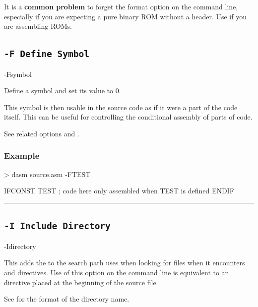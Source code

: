 It is a \textbf{common problem} to forget the format option on the command line, especially if you are expecting a pure binary ROM without a header. Use  if you are assembling ROMs.

\subsection{\texttt{-F Define Symbol}}
\label{flag:definesymbolF}

\begin{usage}
-Fsymbol
\end{usage}

Define a symbol and set its value to 0.

This symbol is then usable in the source code as if it were a part of the code itself. This can be useful for controlling the conditional assembly of parts of code.

See related options  and .

\subsubsection{Example}

\begin{outputx}
> dasm source.asm -FTEST
\end{outputx}

\begin{code}
  IFCONST TEST
    ; code here only assembled when TEST is defined
  ENDIF
\end{code}

\hrule
\subsection{\texttt{-I Include Directory}}
\label{flag:includedirectory}

\begin{usage}
-Idirectory
\end{usage}

This adds the  to the search path \dasm uses when looking for files when it encounters  and  directives. Use of this option on the command line is equivalent to an  directive placed at the beginning of the source file.

See  for the format of the directory name.\\

